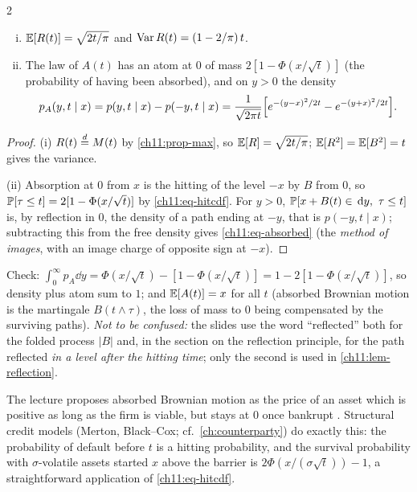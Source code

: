 \begin{paracol}{2}
\begin{proposition}\label{ch11:prop-refabs}
\leavevmode
\begin{enumerate}[(i)]
  \item $\mathbb{E}[R(t)]=\sqrt{2t/\pi}$ and $\operatorname{Var} R(t)=(1-2/\pi)\,t$.
  \item The law of $A(t)$ has an atom at $0$ of mass $2[1-\Phi(x/\sqrt t)]$ (the probability of having been absorbed), and on $y>0$ the
      density
      \begin{equation}\label{ch11:eq-absorbed}
      p_A(y,t\mid x)=p(y,t\mid x)-p(-y,t\mid x)=\frac1{\sqrt{2\pi t}}\Bigl[e^{-(y-x)^2/2t}-e^{-(y+x)^2/2t}\Bigr].
      \end{equation}
\end{enumerate}
\end{proposition}
\begin{proof}
(i) $R(t)\stackrel{d}{=} M(t)$ by \cref{ch11:prop-max}, so $\mathbb{E}[R]=\sqrt{2t/\pi}$; $\mathbb{E}[R^2]=\mathbb{E}[B^2]=t$ gives the variance.

(ii) Absorption at $0$ from $x$ is the hitting of the level $-x$ by $B$ from $0$, so $\mathbb{P}[\tau\le t]=2[1-\Phi(x/\sqrt t)]$
by \eqref{ch11:eq-hitcdf}. For $y>0$, $\mathbb{P}[x+B(t)\in\,\mathrm{d} y,\ \tau\le t]$ is, by reflection in $0$, the density of a path ending at $-y$, that is
$p(-y,t\mid x)$; subtracting this from the free density gives \eqref{ch11:eq-absorbed} (the \emph{method of images}, with an image
charge of opposite sign at $-x$).
\end{proof}
Check: $\int_0^\infty p_A\dd y=\Phi(x/\sqrt t)-[1-\Phi(x/\sqrt t)]=1-2[1-\Phi(x/\sqrt t)]$, so density plus atom sum to $1$; and
$\mathbb{E}[A(t)]=x$ for all $t$ (absorbed Brownian motion is the martingale $B(t\wedge\tau)$, the loss of mass to $0$ being
compensated by the surviving paths). \emph{Not to be confused:} the slides use the word ``reflected'' both for the folded process $|B|$ and, in the section
on the reflection principle, for the path reflected \emph{in a level after the hitting time}; only the second is used in \cref{ch11:lem-reflection}.

\begin{finance}
The lecture proposes absorbed Brownian motion as the price of an asset which is positive as long as the firm is viable, but stays at $0$
once bankrupt . Structural credit models (Merton, Black--Cox; cf.\ \cref{ch:counterparty}) do exactly this: the
probability of default before $t$ is a hitting probability, and the survival probability with $\sigma$-volatile assets started $x$ above the barrier
is $2\Phi(x/(\sigma\sqrt t))-1$, a straightforward application of \eqref{ch11:eq-hitcdf}.
\end{finance}


\end{paracol}
